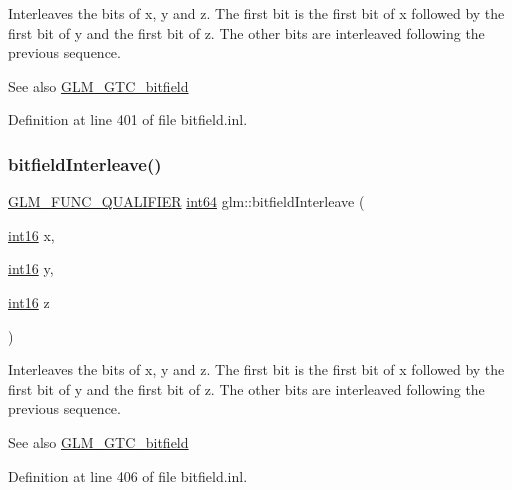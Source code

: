 Interleaves the bits of x, y and z. The first bit is the first bit of x followed by the first bit of y and the first bit of z. The other bits are interleaved following the previous sequence.

\begin{DoxySeeAlso}{See also}
\mbox{\hyperlink{group__gtc__bitfield}{G\+L\+M\+\_\+\+G\+T\+C\+\_\+bitfield}} 
\end{DoxySeeAlso}


Definition at line 401 of file bitfield.\+inl.

\mbox{\label{group__gtc__bitfield_gaf898f842ac089fcc8d6201c32702584a}} 
\subsubsection{\texorpdfstring{bitfieldInterleave()}{bitfieldInterleave()}\hspace{0.1cm}{\footnotesize\ttfamily [9/16]}}
{\footnotesize\ttfamily \mbox{\hyperlink{setup_8hpp_a33fdea6f91c5f834105f7415e2a64407}{G\+L\+M\+\_\+\+F\+U\+N\+C\+\_\+\+Q\+U\+A\+L\+I\+F\+I\+ER}} \mbox{\hyperlink{group__gtc__type__precision_ga435d75819cce297cc5fa21bd84ef89a5}{int64}} glm\+::bitfield\+Interleave (\begin{DoxyParamCaption}\item[{\mbox{\hyperlink{group__gtc__type__precision_ga2945a61d12771f8954994fcddf02b021}{int16}}}]{x,  }\item[{\mbox{\hyperlink{group__gtc__type__precision_ga2945a61d12771f8954994fcddf02b021}{int16}}}]{y,  }\item[{\mbox{\hyperlink{group__gtc__type__precision_ga2945a61d12771f8954994fcddf02b021}{int16}}}]{z }\end{DoxyParamCaption})}

Interleaves the bits of x, y and z. The first bit is the first bit of x followed by the first bit of y and the first bit of z. The other bits are interleaved following the previous sequence.

\begin{DoxySeeAlso}{See also}
\mbox{\hyperlink{group__gtc__bitfield}{G\+L\+M\+\_\+\+G\+T\+C\+\_\+bitfield}} 
\end{DoxySeeAlso}


Definition at line 406 of file bitfield.\+inl.

